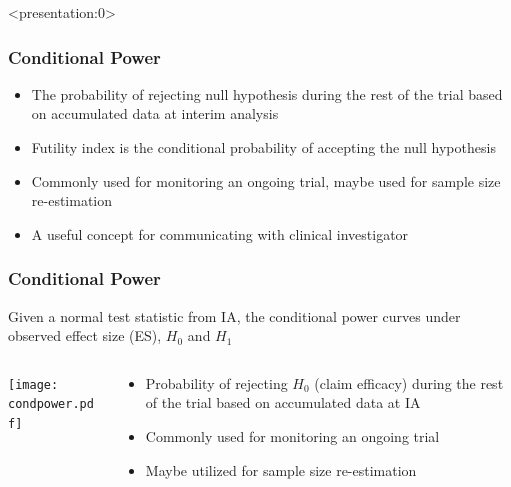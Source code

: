 \documentclass{beamer}
\begin{document}
\begin{frame}<presentation:0>
	\frametitle{Conditional Power}
\begin{itemize}
	\item The probability of rejecting null hypothesis during the rest of the trial based on accumulated data at interim analysis
	\item Futility index is the conditional probability of accepting the null hypothesis
	\item Commonly used for monitoring an ongoing trial, maybe used for sample size re-estimation
	\item A useful concept for communicating with clinical investigator
\end{itemize}
\end{frame}\addtocounter{framenumber}{-1}
\begin{frame}
	\frametitle{Conditional Power}
Given a normal test statistic from IA, the conditional power curves under observed effect size (ES), $H_{0}$ and  $H_{1}$
\begin{columns}
	\begin{column}{0.48\textwidth}
		\texttt{[image: condpower.pdf]} 
	\end{column}
	\begin{column}{0.48\textwidth}	
		\begin{itemize}
			\item Probability of rejecting $H_{0}$ (claim efficacy) during the rest of the trial based on accumulated data at IA
			\item Commonly used for monitoring an ongoing trial
			\item Maybe utilized for sample size re-estimation
		\end{itemize}
	\end{column}
\end{columns}	
\end{frame}
\end{document}

